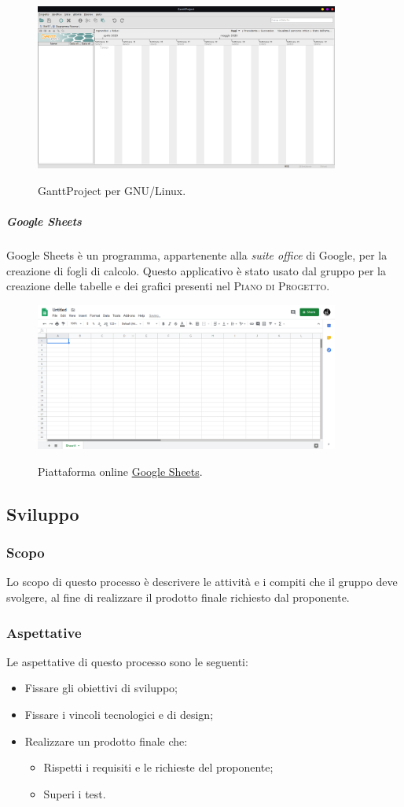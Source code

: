 \documentclass[../norme-di-progetto.tex]{subfiles}
\begin{document}
\begin{figure}[H]
  \centering
  \includegraphics[width=10cm]{img/gantt.png}
  \label{fig:gantt}
  \caption{GanttProject per GNU/Linux.}
\end{figure}

\subparagraph{Google Sheets}
Google Sheets è un programma, appartenente alla \textit{suite office} di Google, per la creazione di fogli di calcolo. Questo applicativo è stato usato dal gruppo per la creazione delle tabelle e dei grafici presenti nel \textsc{Piano di Progetto}.

\begin{figure}[H]
  \centering
  \includegraphics[width=10cm]{img/sheets.png}
  \label{fig:sheets}
  \caption{Piattaforma online \href{https://docs.google.com/spreadsheets/u/0/}{Google Sheets}.}
\end{figure}

\subsection{Sviluppo}
\subsubsection{Scopo}
Lo scopo di questo processo è descrivere le attività e i compiti che il gruppo deve svolgere, al fine di realizzare il prodotto finale richiesto dal proponente.
\subsubsection{Aspettative}
Le aspettative di questo processo sono le seguenti:
\begin{itemize}
  \item Fissare gli obiettivi di sviluppo;
  \item Fissare i vincoli tecnologici e di design;
  \item Realizzare un prodotto finale che:
  \begin{itemize}
    \item Rispetti i requisiti e le richieste del proponente;
    \item Superi i test.
  \end{itemize}
\end{itemize}
\end{document}
